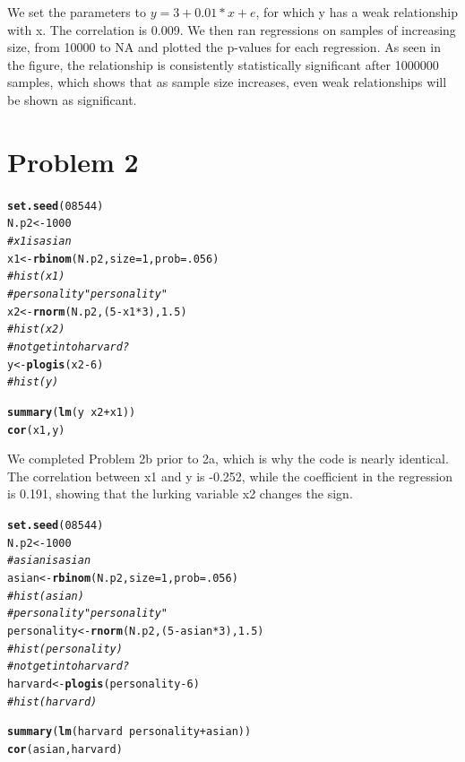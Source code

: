 \documentclass{article}\usepackage[]{graphicx}\usepackage[]{color}
\makeatletter
\newcommand{\hlnum}[1]{\textcolor[rgb]{0.686,0.059,0.569}{#1}}%
\newcommand{\hlcom}[1]{\textcolor[rgb]{0.678,0.584,0.686}{\textit{#1}}}%
\newcommand{\hlopt}[1]{\textcolor[rgb]{0,0,0}{#1}}%
\newcommand{\hlstd}[1]{\textcolor[rgb]{0.345,0.345,0.345}{#1}}%
\newcommand{\hlkwb}[1]{\textcolor[rgb]{0.69,0.353,0.396}{#1}}%
\newcommand{\hlkwc}[1]{\textcolor[rgb]{0.333,0.667,0.333}{#1}}%
\newcommand{\hlkwd}[1]{\textcolor[rgb]{0.737,0.353,0.396}{\textbf{#1}}}%
\newenvironment{kframe}{%
 \def\at@end@of@kframe{}%
 \ifinner\ifhmode%
  \def\at@end@of@kframe{\end{minipage}}%
  \begin{minipage}{\columnwidth}%
 \fi\fi%
 \def\FrameCommand##1{\hskip\@totalleftmargin \hskip-\fboxsep
 \colorbox{shadecolor}{##1}\hskip-\fboxsep
     \hskip-\linewidth \hskip-\@totalleftmargin \hskip\columnwidth}%
 \MakeFramed {\advance\hsize-\width
   \@totalleftmargin\z@ \linewidth\hsize
   \@setminipage}}%
 {\par\unskip\endMakeFramed%
 \at@end@of@kframe}
\newenvironment{knitrout}{}{} %
\makeatother
\begin{document}
\noindent We set the parameters to $y = 3 + 0.01*x + e$, for which y has a weak relationship with x.  The correlation is 0.009. We then ran regressions on samples of increasing size, from 10000 to NA and plotted the p-values for each regression.  As seen in the figure, the relationship is consistently statistically significant after 1000000 samples, which shows that as sample size increases, even weak relationships will be shown as significant.


\section*{Problem 2}

\begin{knitrout}
\color{fgcolor}\begin{kframe}
\begin{alltt}
\hlkwd{set.seed}\hlstd{(}\hlnum{08544}\hlstd{)}
\hlstd{N.p2} \hlkwb{<-} \hlnum{1000}
\hlcom{#x1 is asian}
\hlstd{x1} \hlkwb{<-} \hlkwd{rbinom}\hlstd{(N.p2,} \hlkwc{size} \hlstd{=} \hlnum{1}\hlstd{,} \hlkwc{prob} \hlstd{=} \hlnum{.056}\hlstd{)}
\hlcom{#hist(x1)}
\hlcom{#personality "personality"}
\hlstd{x2} \hlkwb{<-} \hlkwd{rnorm}\hlstd{(N.p2, (}\hlnum{5} \hlopt{-} \hlstd{x1}\hlopt{*}\hlnum{3}\hlstd{),} \hlnum{1.5}\hlstd{)}
\hlcom{#hist(x2)}
\hlcom{#not get into harvard?}
\hlstd{y} \hlkwb{<-} \hlkwd{plogis}\hlstd{(x2} \hlopt{-} \hlnum{6}\hlstd{)}
\hlcom{#hist(y)}

\hlkwd{summary}\hlstd{(}\hlkwd{lm}\hlstd{(y} \hlopt{~} \hlstd{x2} \hlopt{+} \hlstd{x1))}
\hlkwd{cor}\hlstd{(x1, y)}
\end{alltt}
\end{kframe}
\end{knitrout}
\noindent We completed Problem 2b prior to 2a, which is why the code is nearly identical. The correlation between x1 and y is -0.252, while the coefficient in the regression is 0.191, showing that the lurking variable x2 changes the sign.\\

\begin{knitrout}
\color{fgcolor}\begin{kframe}
\begin{alltt}
\hlkwd{set.seed}\hlstd{(}\hlnum{08544}\hlstd{)}
\hlstd{N.p2} \hlkwb{<-} \hlnum{1000}
\hlcom{#asian is asian}
\hlstd{asian} \hlkwb{<-} \hlkwd{rbinom}\hlstd{(N.p2,} \hlkwc{size} \hlstd{=} \hlnum{1}\hlstd{,} \hlkwc{prob} \hlstd{=} \hlnum{.056}\hlstd{)}
\hlcom{#hist(asian)}
\hlcom{#personality "personality"}
\hlstd{personality} \hlkwb{<-} \hlkwd{rnorm}\hlstd{(N.p2, (}\hlnum{5} \hlopt{-} \hlstd{asian}\hlopt{*}\hlnum{3}\hlstd{),} \hlnum{1.5}\hlstd{)}
\hlcom{#hist(personality)}
\hlcom{#not get into harvard?}
\hlstd{harvard} \hlkwb{<-} \hlkwd{plogis}\hlstd{(personality} \hlopt{-} \hlnum{6}\hlstd{)}
\hlcom{#hist(harvard)}

\hlkwd{summary}\hlstd{(}\hlkwd{lm}\hlstd{(harvard} \hlopt{~} \hlstd{personality} \hlopt{+} \hlstd{asian))}
\hlkwd{cor}\hlstd{(asian, harvard)}
\end{alltt}
\end{kframe}
\end{knitrout}
\end{document}
